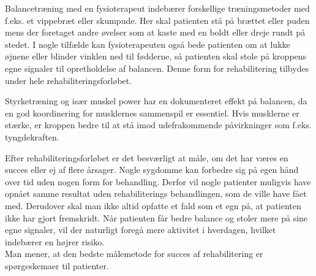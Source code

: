 Balancetræning med en fysioterapeut indebærer forskellige træningsmetoder med f.eks. et vippebræt eller skumpude. Her skal patienten stå på brættet eller puden mens der foretaget andre øvelser som at kaste med en boldt eller dreje rundt på stedet. I nogle tilfælde kan fysioterapeuten også bede patienten om at lukke øjnene eller blinder vinklen ned til fødderne, så patienten skal stole på kroppens egne signaler til opretholdelse af balancen. \cite{Joergensen2004} Denne form for rehabilitering tilbydes under hele rehabiliteringsforløbet. \cite{Sundhedsstyrelsen2011a}

Styrketræning og især muskel power har en dokumenteret effekt på balancen, da en god koordinering for musklernes sammenspil er essentiel. Hvis musklerne er stærke, er kroppen bedre til at stå imod udefrakommende påvirkninger som f.eks. tyngdekraften. \cite{Joergensen2004}

Efter rehabiliteringsforløbet er det besværligt at måle, om det har væres en succes eller ej af flere årsager. Nogle sygdomme kan forbedre sig på egen hånd over tid uden nogen form for behandling. Derfor vil nogle patienter muligvis have opnået samme resultat uden rehabiliterings behandlingen, som de ville have fået med. Derudover skal man ikke altid opfatte et fald som et egn på, at patienten ikke har gjort fremskridt. Når patienten får bedre balance og stoler mere på sine egne signaler, vil der naturligt foregå mere aktivitet i hverdagen, hvilket indebærer en højrer risiko. \cite{Hain2008} \\
Man mener, at den bedste målemetode for succes af rehabilitering er spørgeskemaer til patienter. \cite{Hain2008}